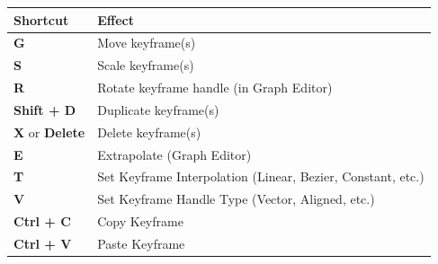 \documentclass{article}
\begin{document}
\begin{longtable}{ll}
    \toprule
    \textbf{Shortcut}             & \textbf{Effect}                                             \\
    \midrule
    \endhead
    \bottomrule
    \endfoot

    \textbf{G}                    & Move keyframe(s)                                            \\
    \textbf{S}                    & Scale keyframe(s)                                           \\
    \textbf{R}                    & Rotate keyframe handle (in Graph Editor)                    \\
    \textbf{Shift + D}            & Duplicate keyframe(s)                                       \\
    \textbf{X} or \textbf{Delete} & Delete keyframe(s)                                          \\
    \textbf{E}                    & Extrapolate (Graph Editor)                                  \\
    \textbf{T}                    & Set Keyframe Interpolation (Linear, Bezier, Constant, etc.) \\
    \textbf{V}                    & Set Keyframe Handle Type (Vector, Aligned, etc.)            \\
    \textbf{Ctrl + C}             & Copy Keyframe                                               \\
    \textbf{Ctrl + V}             & Paste Keyframe                                              \\
\end{longtable}
\end{document}
